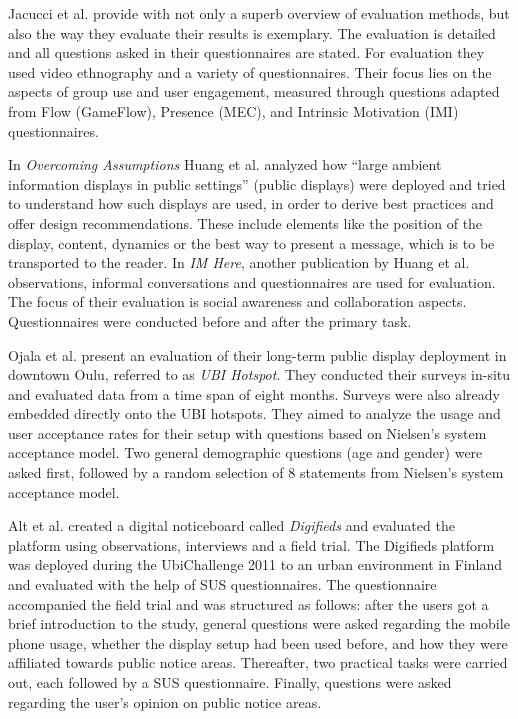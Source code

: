 	Jacucci et al. provide with \cite{jacucci2010worldsofinformation} not only a superb overview of evaluation methods, but also the way they evaluate their results is exemplary. The evaluation is detailed and all questions asked in their questionnaires are stated. For evaluation they used video ethnography and a variety of questionnaires. Their focus lies on the aspects of group use and user engagement, measured through questions adapted from Flow (GameFlow), Presence (MEC), and Intrinsic Motivation (IMI) questionnaires.

	In \textit{Overcoming Assumptions} Huang et al. analyzed how ``large ambient information displays in public settings'' \cite{huang2008overcoming} (public displays) were deployed and tried to understand how such displays are used, in order to derive best practices and offer design recommendations. These include elements like the position of the display, content, dynamics or the best way to present a message, which is to be transported to the reader.
	In \textit{IM Here}, another publication by Huang et al. \cite{Huang2004} observations, informal conversations and questionnaires are used for evaluation. The focus of their evaluation is social awareness and collaboration aspects. Questionnaires were conducted before and after the primary task.

	Ojala et al. \cite{ojala2010ubi} present an evaluation of their long-term public display deployment in downtown Oulu, referred to as \textit{UBI Hotspot}. They conducted their surveys in-situ and evaluated data from a time span of eight months. Surveys were also already embedded directly onto the UBI hotspots. They aimed to analyze the usage and user acceptance rates for their setup with questions based on Nielsen's system acceptance model. Two general demographic questions (age and gender) were asked first, followed by a random selection of 8 statements from Nielsen's system acceptance model.


	Alt et al. \cite{alt2011digifieds} created a digital noticeboard called \textit{Digifieds} and evaluated the platform using observations, interviews and a field trial. The Digifieds platform was deployed during the UbiChallenge 2011 to an urban environment in Finland and evaluated with the help of SUS questionnaires. The questionnaire accompanied the field trial and was structured as follows: after the users got a brief introduction to the study, general questions were asked regarding the mobile phone usage, whether the display setup had been used before, and how they were affiliated towards public notice areas. Thereafter, two practical tasks were carried out, each followed by a SUS questionnaire. Finally, questions were asked regarding the user's opinion on public notice areas. 


